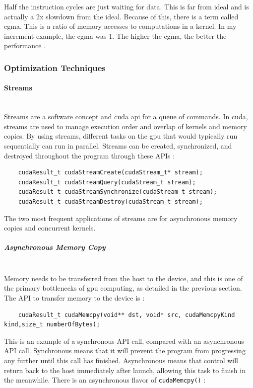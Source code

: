 Half the instruction cycles are just waiting for data. This is far from ideal and is actually a 2x slowdown from the ideal. Because of this, there is a term called \gls{cgma}. This is a ratio of memory accesses to computations in a kernel. In my increment example, the \gls{cgma} was 1. The higher the \gls{cgma}, the better the performance \citep{kirk_hwu_2010}.

\subsubsection{Optimization Techniques}
\paragraph{Streams} \hspace{0pt} \\
\indent Streams are a software concept and \gls{cuda} \gls{api} for a queue of commands. In \gls{cuda}, streams are used to manage execution order and overlap of kernels and memory copies. By using streams, different tasks on the \gls{gpu} that would typically run sequentially can run in parallel. Streams can be created, synchronized, and destroyed throughout the program through these APIs \citep{cudaC}:
\begin{verbatim}
    cudaResult_t cudaStreamCreate(cudaStream_t* stream);
    cudaResult_t cudaStreamQuery(cudaStream_t stream);
    cudaResult_t cudaStreamSynchronize(cudaStream_t stream);
    cudaResult_t cudaStreamDestroy(cudaStream_t stream);
\end{verbatim}
The two most frequent applications of streams are for asynchronous memory copies and concurrent kernels. 
\subparagraph{Asynchronous Memory Copy} \hspace{0pt} \\
\indent Memory needs to be transferred from the host to the device, and this is one of the primary bottlenecks of \gls{gpu} computing, as detailed in the previous section. The API to transfer memory to the device is \citep{cudaC}:

\begin{verbatim}
    cudaResult_t cudaMemcpy(void** dst, void* src, cudaMemcpyKind kind,size_t numberOfBytes);
\end{verbatim}

This is an example of a synchronous API call, compared with an asynchronous API call. Synchronous means that it will prevent the program from progressing any further until this call has finished. Asynchronous means that control will return back to the host immediately after launch, allowing this task to finish in the meanwhile. There is an asynchronous flavor of \verb|cudaMemcpy()| \citep{cudaC}:

